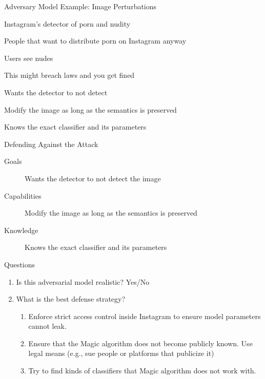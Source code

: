 \documentclass[10pt]{beamer}
\begin{document}
\begin{frame}[fragile]{Adversary Model Example: Image Perturbations}
  \begin{description}[<+->]
    \item[Classifier] Instagram's detector of porn and nudity
    \item[Adversary] People that want to distribute porn on Instagram anyway
    \item[Threat] Users see nudes
    \item[Risk] This might breach laws and you get fined
    \item[Goals] Wants the detector to not detect
    \item[Capabilities] Modify the image as long as the semantics is preserved
    \item[Knowledge] Knows the exact classifier and its parameters
  \end{description}

\end{frame}


\begin{frame}{Defending Against the Attack}
  \begin{description}
    \item[Goals] Wants the detector to not detect the image
    \item[Capabilities] Modify the image as long as the semantics is preserved
    \item[Knowledge] Knows the exact classifier and its parameters
  \end{description}

  \pause
  \begin{alertblock}{Questions}
    \begin{enumerate}[<+->]
      \item Is this adversarial model realistic? Yes/No
      \item What is the best defense strategy?
        \begin{enumerate}
          \item Enforce strict access control inside Instagram to ensure model parameters cannot leak.
          \item Ensure that the \textsf{Magic} algorithm does not become publicly known. Use legal
            means (e.g., sue people or platforms that publicize it)
          \item Try to find kinds of classifiers that \textsf{Magic} algorithm does not work with.
        \end{enumerate}
    \end{enumerate}
  \end{alertblock}

\end{frame}
\end{document}
